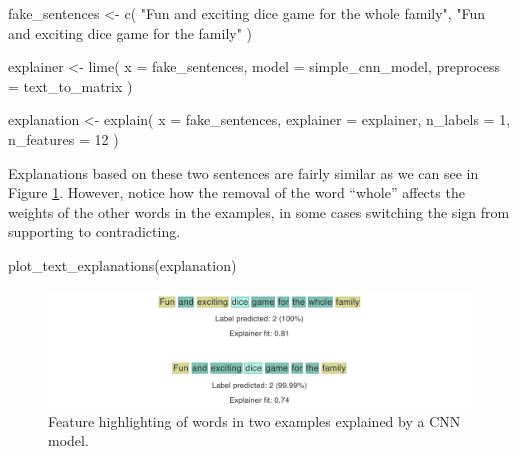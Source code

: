 \documentclass[
]{krantz}
\makeatletter
\newenvironment{Shaded}{\begin{snugshade}}{\end{snugshade}}
\newcommand{\AttributeTok}[1]{\textcolor[rgb]{0.77,0.63,0.00}{#1}}
\newcommand{\DecValTok}[1]{\textcolor[rgb]{0.00,0.00,0.81}{#1}}
\newcommand{\FunctionTok}[1]{\textcolor[rgb]{0.00,0.00,0.00}{#1}}
\newcommand{\NormalTok}[1]{#1}
\newcommand{\OtherTok}[1]{\textcolor[rgb]{0.56,0.35,0.01}{#1}}
\newcommand{\StringTok}[1]{\textcolor[rgb]{0.31,0.60,0.02}{#1}}
\newenvironment{kframe}{%
\medskip{}
\setlength{\fboxsep}{.8em}
 \def\at@end@of@kframe{}%
 \ifinner\ifhmode%
  \def\at@end@of@kframe{\end{minipage}}%
  \begin{minipage}{\columnwidth}%
 \fi\fi%
 \def\FrameCommand##1{\hskip\@totalleftmargin \hskip-\fboxsep
 \colorbox{shadecolor}{##1}\hskip-\fboxsep
     \hskip-\linewidth \hskip-\@totalleftmargin \hskip\columnwidth}%
 \MakeFramed {\advance\hsize-\width
   \@totalleftmargin\z@ \linewidth\hsize
   \@setminipage}}%
 {\par\unskip\endMakeFramed%
 \at@end@of@kframe}
\renewenvironment{Shaded}{\begin{kframe}}{\end{kframe}}
\makeatother
\begin{document}
\begin{Shaded}
\begin{Highlighting}[]
\NormalTok{fake\_sentences }\OtherTok{\textless{}{-}} \FunctionTok{c}\NormalTok{(}
  \StringTok{"Fun and exciting dice game for the whole family"}\NormalTok{,}
  \StringTok{"Fun and exciting dice game for the family"}
\NormalTok{)}

\NormalTok{explainer }\OtherTok{\textless{}{-}} \FunctionTok{lime}\NormalTok{(}
  \AttributeTok{x =}\NormalTok{ fake\_sentences,}
  \AttributeTok{model =}\NormalTok{ simple\_cnn\_model,}
  \AttributeTok{preprocess =}\NormalTok{ text\_to\_matrix}
\NormalTok{)}

\NormalTok{explanation }\OtherTok{\textless{}{-}} \FunctionTok{explain}\NormalTok{(}
  \AttributeTok{x =}\NormalTok{ fake\_sentences,}
  \AttributeTok{explainer =}\NormalTok{ explainer,}
  \AttributeTok{n\_labels =} \DecValTok{1}\NormalTok{,}
  \AttributeTok{n\_features =} \DecValTok{12}
\NormalTok{)}
\end{Highlighting}
\end{Shaded}

Explanations based on these two sentences are fairly similar as we can see in Figure \ref{fig:robustlimeplottextexplanations}. However, notice how the removal of the word ``whole'' affects the weights of the other words in the examples, in some cases switching the sign from supporting to contradicting.

\begin{Shaded}
\begin{Highlighting}[]
\FunctionTok{plot\_text\_explanations}\NormalTok{(explanation)}
\end{Highlighting}
\end{Shaded}

\begin{figure}

{\centering \includegraphics[width=0.9\linewidth]{images/plot_text_explanations_2} 

}

\caption{Feature highlighting of words in two examples explained by a CNN model.}\label{fig:robustlimeplottextexplanations}
\end{figure}
\end{document}
